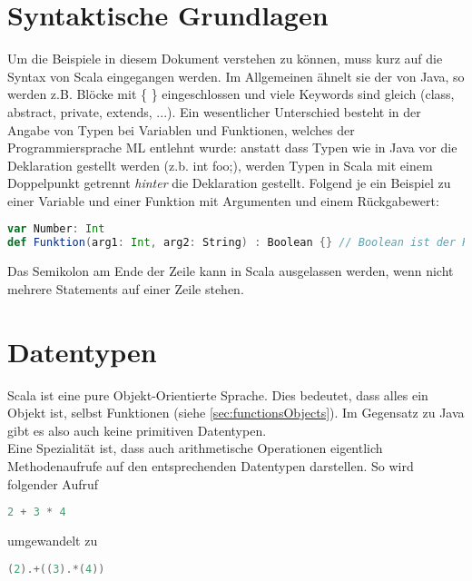 \section{Syntaktische Grundlagen}
\label{sec:syntax}

Um die Beispiele in diesem Dokument verstehen zu können, muss kurz
auf die Syntax von Scala eingegangen werden. Im Allgemeinen ähnelt
sie der von Java, so werden z.B. Blöcke mit \{ \} eingeschlossen und
viele Keywords sind gleich (class, abstract, private, extends, ...).
Ein wesentlicher Unterschied besteht in der Angabe von Typen bei
Variablen und Funktionen, welches der Programmiersprache ML entlehnt
wurde: anstatt dass Typen wie in Java vor die Deklaration gestellt werden
(z.b. int foo;), werden Typen in Scala mit einem Doppelpunkt getrennt
\emph{hinter} die Deklaration gestellt. Folgend je ein Beispiel zu einer
Variable und einer Funktion mit Argumenten und einem Rückgabewert:

\begin{lstlisting}[float=ht,language=scala,caption=Typenangabe,label=lst:types]
var Number: Int
def Funktion(arg1: Int, arg2: String) : Boolean {} // Boolean ist der Rueckgabewert
\end{lstlisting}

Das Semikolon am Ende der Zeile kann in Scala ausgelassen werden, wenn nicht
mehrere Statements auf einer Zeile stehen.

\section{Datentypen}
\label{sec:datatypes}

Scala ist eine pure Objekt-Orientierte Sprache. Dies bedeutet, dass alles
ein Objekt ist, selbst Funktionen (siehe \ref{sec:functionsObjects}). Im
Gegensatz zu Java gibt es also auch keine primitiven Datentypen.\\

Eine Spezialität ist, dass auch arithmetische Operationen eigentlich
Methodenaufrufe auf den entsprechenden Datentypen darstellen. So wird
folgender Aufruf

\begin{lstlisting}[float=ht,language=scala,caption=Arithmetische Operationen,label=lst:arithmetic]
2 + 3 * 4
\end{lstlisting}

umgewandelt zu
\begin{lstlisting}[float=ht,language=scala,caption=Arithmetische Operationen konvertiert,label=lst:arithmeticConverted]
(2).+((3).*(4))
\end{lstlisting}

